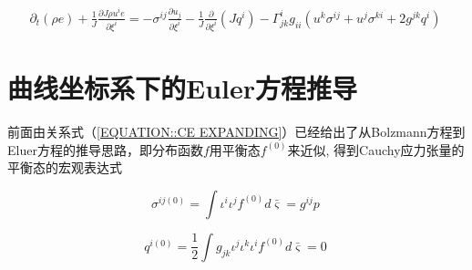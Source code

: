 \documentclass[MathematicsNumericsDerivationsAndOpenFOAM.tex]{subfiles}
\begin{document}
\begin{equation}
  \begin{gathered}
    \boxed{
    \partial_{t}\left(\rho e\right) + \frac{1}{J}\frac{\partial J \rho u^i e}{\partial  \xi^{i}}  = -\sigma^{ij}  \frac{\partial  u_j}{\partial \xi^{i}}  - \frac{1}{J}\frac{\partial}{\partial \xi^{i}} (J q^{i})  - \Gamma^i_{j k}g_{ii}(u^k \sigma^{ij}+u^j \sigma^{ki}+ 2g^{jk}q^i)
    }
  \end{gathered}
  \label{动量方程输运形式4} ~
\end{equation}






\section{曲线坐标系下的Euler方程推导}




前面由关系式（\ref{EQUATION::CE EXPANDING}）已经给出了从Bolzmann方程到Eluer方程的推导思路，即分布函数$f$用平衡态$f^{(0)}$来近似, 得到Cauchy应力张量的平衡态的宏观表达式

\begin{equation}
  \sigma^{ij(0)} =\int \iota^{i} \iota^{j} f^{(0)}  d \bar{\varsigma}= g^{ij} p
  \label{EQUATION::Cauchy应力张量1} ~
\end{equation}


\begin{equation}
  q^{i (0)} =\frac{1}{2}\int g_{jk} \iota^{j} \iota^{k}  \iota^{i} f^{(0)}  d \bar{\varsigma}= 0
  \label{EQUATION::heat flux} ~
\end{equation}





%
%




%
%
%
%

%
%
\end{document}
